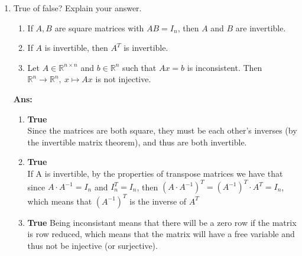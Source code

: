 \documentclass[12pt,a4paper]{amsart}
\newcommand{\R}{\mathbb{R}}
\newcommand\sol[1]{
\medskip
\begin{mdframed}
\textbf{Ans:\\} #1
\end{mdframed}
\medskip
}
\begin{document}
\begin{enumerate}
\sol{
  \begin{enumerate}
    \item
      The inverse of a rotation counter clockwise by angle $\alpha$ is a rotation clockwise by angle $\alpha$
      \\The standard matrix for $R^{-1}$ is $A=\left[\begin{matrix} \cos(\alpha) & \sin(\alpha) \\ -\sin(\alpha) & \cos(\alpha) \end{matrix}\right]$ (the inverse of the regular rotation matrix)
    \item
      The inverse of a reflection over a line is the same reflection over the same line. This means that the matrix $B$ is its own inverse.
  \end{enumerate}
}


\item
 True of false? Explain your answer.
\begin{enumerate}
\item If $A,B$ are square matrices with $AB=I_n$, then $A$ and $B$ are invertible.
\item If $A$ is invertible, then $A^T$ is invertible.
\item Let $A\in\R^{n\times n}$ and $b\in\R^n$ such that $Ax=b$ is inconsistent. Then $\R^n\to\R^n,\ x\mapsto Ax$ is not injective.   
\end{enumerate}

\sol{
  \begin{enumerate}
    \item \textbf{True}\\
      Since the matrices are both square, they must be each other's inverses (by the invertible matrix theorem), and thus are both invertible.
    \item \textbf{True}\\
      If A is invertible, by the properties of transpose matrices we have that since $A\cdot A^{-1}=I_n$ and $I_n^T=I_n$, then $(A\cdot A^{-1})^T=(A^{-1})^T\cdot A^T=I_n$, which means that $(A^{-1})^T$ is the inverse of $A^T$
    \item \textbf{True}
      Being inconsistant means that there will be a zero row if the matrix is row reduced, which means that the matrix will have a free variable and thus not be injective (or surjective).
  \end{enumerate}
}

\end{enumerate}
\end{document}
